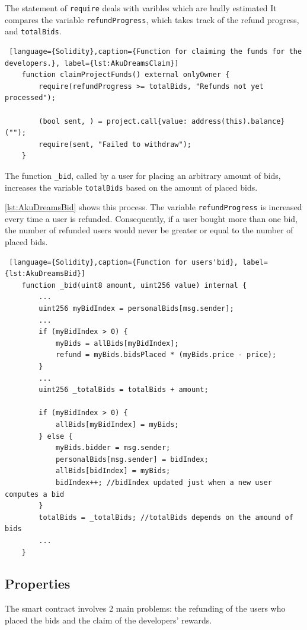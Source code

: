 The statement of \texttt{require} deals with varibles which are badly estimated
It compares the variable \texttt{refundProgress}, which takes track of the refund progress, 
and \texttt{totalBids}.
\begin{lstlisting} [language={Solidity},caption={Function for claiming the funds for the developers.}, label={lst:AkuDreamsClaim}]
    function claimProjectFunds() external onlyOwner {
        require(refundProgress >= totalBids, "Refunds not yet processed");

        (bool sent, ) = project.call{value: address(this).balance}("");
        require(sent, "Failed to withdraw");        
    }
\end{lstlisting}
The function \texttt{\_bid}, called by a user for placing an arbitrary amount of bids, increases the variable \texttt{totalBids} based on the amount of placed bids.

\autoref{lst:AkuDreamsBid} shows this process. 
The variable \texttt{refundProgress} is increased every time a user is refunded. 
Consequently, if a user bought more than one bid, the number of refunded users would never be greater or equal to the number of placed bids.

\begin{lstlisting} [language={Solidity},caption={Function for users'bid}, label={lst:AkuDreamsBid}]
    function _bid(uint8 amount, uint256 value) internal {
        ...
        uint256 myBidIndex = personalBids[msg.sender];
        ...
        if (myBidIndex > 0) {
            myBids = allBids[myBidIndex];
            refund = myBids.bidsPlaced * (myBids.price - price);
        }
        ...
        uint256 _totalBids = totalBids + amount;

        if (myBidIndex > 0) {
            allBids[myBidIndex] = myBids;
        } else {
            myBids.bidder = msg.sender;
            personalBids[msg.sender] = bidIndex;
            allBids[bidIndex] = myBids;
            bidIndex++; //bidIndex updated just when a new user computes a bid
        }
        totalBids = _totalBids; //totalBids depends on the amound of bids
        ...
    }
\end{lstlisting}

\subsection{Properties}
The smart contract involves 2 main problems: the refunding of the users who placed the bids and the claim of the developers' rewards.

